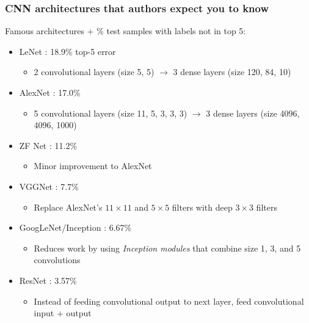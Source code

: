 \begin{frame}
    \frametitle{CNN architectures that authors expect you to know}

    Famous architectures + \% test samples with labels not in top 5:
    \begin{itemize}
        \item<+-> LeNet \citep{LeCunIEEE98}: 18.9\% top-5 error
        \begin{itemize}
            \item 2 convolutional layers (size 5, 5) $\to$ 3 dense layers (size 120, 84, 10)
        \end{itemize}
        \item<+-> AlexNet \citep{KrizhevskyNIPS12}: 17.0\%
        \begin{itemize}
            \item 5 convolutional layers (size 11, 5, 3, 3, 3) $\to$ 3 dense layers (size 4096, 4096, 1000)
        \end{itemize}
        \item<+-> ZF Net \citep{ZeilerECCV14}: 11.2\%
        \begin{itemize}
            \item Minor improvement to AlexNet
        \end{itemize}
        \item<+-> VGGNet \citep{Simonyan14}: 7.7\%
        \begin{itemize}
            \item Replace AlexNet's $11 \times 11$ and $5 \times 5$ filters with deep $3 \times 3$ filters
        \end{itemize}
        \item<+-> GoogLeNet/Inception \citep{SzegedyIEEECVPR15}: 6.67\%
        \begin{itemize}
            \item Reduces work by using \emph{Inception modules} that combine size 1, 3, and 5 convolutions
        \end{itemize}
        \item<+-> ResNet \citep{He15b}: 3.57\%
        \begin{itemize}
            \item Instead of feeding convolutional output to next layer, feed convolutional input + output
        \end{itemize}
    \end{itemize}
\end{frame}


